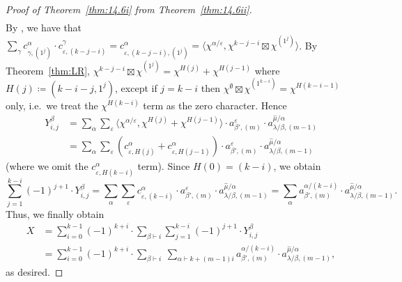 \begin{proof}[Proof of Theorem~\ref{thm:14.6i} from Theorem~\ref{thm:14.6ii}]
\begin{align*}
	\end{align*}
	By \cite[(2.1)]{SLthesis}, we have that $\sum_\gamma c^\alpha_{\gamma,(1^j)}\cdot c^{\gamma}_{\varepsilon,(k-j-i)} = c^{\alpha}_{\varepsilon,(k-j-i),(1^j)} = \langle \chi^{\alpha/\varepsilon}, \chi^{k-j-i}\boxtimes \chi^{(1^j)}\rangle$. By Theorem~\ref{thm:LR}, $\chi^{k-j-i}\boxtimes \chi^{(1^j)} = \chi^{H(j)}+\chi^{H(j-1)}$ where $H(j)\coloneqq (k-i-j,1^j)$, except if $j=k-i$ then $\chi^\emptyset\boxtimes \chi^{(1^{k-i})}=\chi^{H(k-i-1)}$ only, i.e.~we treat the $\chi^{H(k-i)}$ term as the zero character. Hence
	\begin{align*}
		Y^\beta_{i,j} &= \sum_\alpha \sum_\varepsilon \langle \chi^{\alpha/\varepsilon}, \chi^{H(j)}+\chi^{H(j-1)}\rangle \cdot a^\varepsilon_{\beta',(m)}\cdot a^{\hat{\mu}/\alpha}_{\lambda/\beta,(m-1)}\\
		&= \sum_\alpha \sum_\varepsilon (c^\alpha_{\varepsilon,H(j)} + c^\alpha_{\varepsilon,H(j-1)}) \cdot a^\varepsilon_{\beta',(m)}\cdot a^{\hat{\mu}/\alpha}_{\lambda/\beta,(m-1)}
	\end{align*}
	(where we omit the $c^\alpha_{\varepsilon,H(k-i)}$ term). Since $H(0)=(k-i)$, we obtain
	\[ \sum_{j=1}^{k-i}(-1)^{j+1} \cdot Y^\beta_{i,j} = \sum_\alpha \sum_\varepsilon c^\alpha_{\varepsilon,(k-i)}\cdot a^\varepsilon_{\beta',(m)}\cdot a^{\hat{\mu}/\alpha}_{\lambda/\beta,(m-1)} = \sum_\alpha a^{\alpha/(k-i)}_{\beta',(m)}\cdot a^{\hat{\mu}/\alpha}_{\lambda/\beta,(m-1)}.\]
	Thus, we finally obtain
	\begin{align*} X &= \sum_{i=0}^{k-1}(-1)^{k+i} \cdot \sum_{\beta\vdash i} \sum_{j=1}^{k-i}(-1)^{j+1}\cdot Y^\beta_{i,j} \\&= \sum_{i=0}^{k-1}(-1)^{k+i}\cdot \sum_{\beta\vdash i}\ \sum_{\alpha\vdash k+(m-1)i} a^{\alpha/(k-i)}_{\beta',(m)}\cdot a^{\hat{\mu}/\alpha}_{\lambda/\beta,(m-1)}, \end{align*}
	as desired.
\end{proof}
